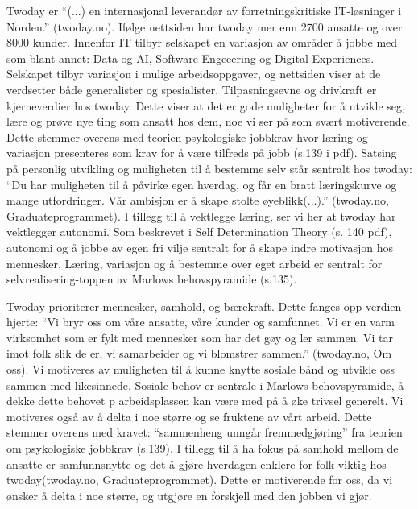 Twoday er “(...) en internasjonal leverandør av forretningskritiske IT-løsninger i Norden.” 
(twoday.no). Ifølge nettsiden har twoday mer enn 2700 ansatte og over 8000 kunder. Innenfor IT 
tilbyr selskapet en variasjon av områder å jobbe med som blant annet: Data og AI, Software Engeeering 
og Digital Experiences. Selskapet tilbyr variasjon i mulige arbeidsoppgaver, og nettsiden viser at de
 verdsetter både generalister og spesialister. Tilpasningsevne og drivkraft er kjerneverdier hos twoday.
   Dette viser at det er gode muligheter for å utvikle seg, lære og prøve nye ting som ansatt hos dem, 
   noe vi ser på som svært motiverende. Dette stemmer overens med teorien psykologiske jobbkrav hvor 
   læring og variasjon presenteres som krav for å være tilfreds på jobb (s.139 i pdf). Satsing på 
   personlig utvikling og muligheten til å bestemme selv står sentralt hos twoday: “Du har muligheten 
   til å påvirke egen hverdag, og får en bratt læringskurve og mange utfordringer. Vår ambisjon er å
    skape stolte øyeblikk(...).” (twoday.no, Graduateprogrammet). I tillegg til å vektlegge læring, ser
    vi her at twoday har vektlegger autonomi. Som beskrevet i Self Determination Theory (s. 140 pdf), 
    autonomi og å jobbe av egen fri vilje sentralt for å skape indre motivasjon hos mennesker. Læring, 
    variasjon og å bestemme over eget arbeid er sentralt for selvrealisering-toppen av Marlows 
    behovspyramide (s.135).


    
Twoday prioriterer mennesker, samhold, og bærekraft. Dette fanges opp verdien hjerte:
 “Vi bryr oss om våre ansatte, våre kunder og samfunnet. Vi er en varm virksomhet som er fylt 
 med mennesker som har det gøy og ler sammen. Vi tar imot folk slik de er, vi samarbeider og vi 
 blomstrer sammen.” (twoday.no, Om oss). Vi motiveres av muligheten til å kunne knytte sosiale bånd 
 og utvikle oss sammen med likesinnede. Sosiale behov er sentrale i Marlows behovspyramide, å dekke 
 dette behovet p arbeidsplassen kan være med på å øke trivsel generelt. Vi motiveres også av å delta 
 i noe større og se fruktene av vårt arbeid. Dette stemmer overens med kravet: “sammenheng unngår 
 fremmedgjøring” fra teorien om psykologiske jobbkrav (s.139). I tillegg til å ha fokus på samhold 
 mellom de ansatte er samfunnsnytte og det å gjøre hverdagen enklere for folk viktig hos 
 twoday(twoday.no, Graduateprogrammet). Dette er motiverende for oss, da vi ønsker å delta i noe 
 større, og utgjøre en forskjell med den jobben vi gjør.  